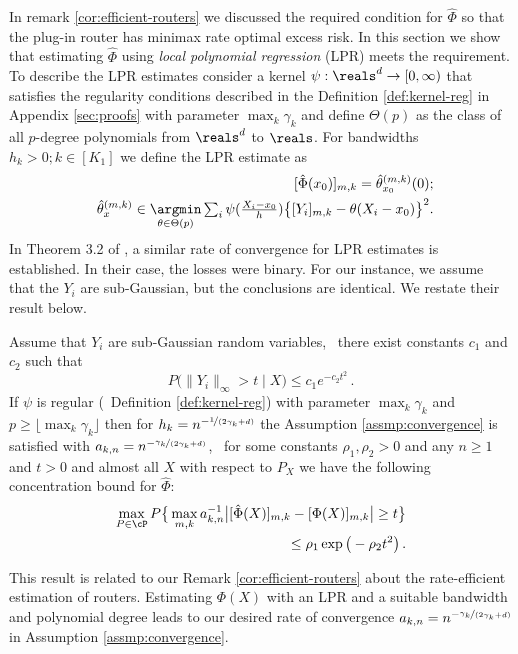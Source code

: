 In remark \ref{cor:efficient-routers} we discussed the required condition for $\hat \Phi$ so that the plug-in router has minimax rate optimal excess risk. In this section we show that estimating $\hat \Phi$ using \emph{local polynomial regression} (LPR) meets the requirement.  To describe the LPR estimates consider a kernel $\psi: \reals^d \to [0, \infty)$ that satisfies the regularity conditions described in the Definition \ref{def:kernel-reg} in  Appendix \ref{sec:proofs} with parameter $\max_k \gamma_k$ and define $\Theta(p)$ as the class of all $p$-degree polynomials from $\reals^d$ to $\reals$. For bandwidths $h_k > 0; k \in [K_1]$ we define the LPR estimate as 
\begin{align}\label{eq:LPR}
    [\hat \Phi(x_0)]_{m, k} = \hat\theta_{x_0}^{(m, k)}(0); \nonumber \\
    ~~ \hat \theta_x^{(m, k)} \in \underset{\theta \in \Theta(p)}{\argmin}  \textstyle \sum_{i} \psi (\frac{X_i - x_0}{h}) \big \{[Y_i]_{m ,k} - \theta (X_i -x_0 )\big\}^2. 
\end{align}
In Theorem 3.2 of \citet{audibert2007Fast}, a similar rate of convergence for LPR estimates is established. In their case, the losses were binary. For our instance, we assume that the $Y_i$ are sub-Gaussian, but the conclusions are identical. We restate their result below.
\begin{lemma}
    Assume that $Y_i$ are sub-Gaussian random variables, \ie\ there exist constants $c_1$ and $c_2$ such that  
    \[
    \textstyle P\big ( \|Y_i\|_\infty > t \mid X\big ) \le c_1 e^{-c_2t^2}\,. 
    \] If $\psi$ is regular (\cf\ Definition \ref{def:kernel-reg}) with parameter $\max_k \gamma_k$  and $p \ge  \lfloor \max_k \gamma_k \rfloor$ then for $h_k = n^{-\nicefrac{1}{(2\gamma_k + d)}}$ the Assumption \ref{assmp:convergence} is satisfied with $a_{k, n} = n^{-\nicefrac{\gamma_k}{(2\gamma_k + d)}}$, \ie\ for some constants $\rho_1, \rho_2 > 0$ and any $n \ge 1$ and $t > 0$ and almost all $X$ with respect to $P_X$ we have the following concentration bound for $\hat \Phi$:
    \begin{align}\label{eq:concentration-phi-2}
        \max_{P\in \cP} P \big \{ \max_{m, k} a_{k, n}^{-1}\big |[\hat \Phi (X)]_{m, k} - [\Phi  (X)]_{m, k}\big |  \ge t\big \} \nonumber \\
        \le  \rho_1 \exp\big (- \rho_2  t^2 \big )\,.
    \end{align}
\end{lemma}
This result is related to our Remark \ref{cor:efficient-routers} about the rate-efficient estimation of routers. Estimating $\Phi(X)$ with an LPR and a suitable bandwidth and polynomial degree leads to our desired rate of convergence $a_{k, n} = n^{-\nicefrac{\gamma_k}{(2\gamma_k + d)}}$ in Assumption \ref{assmp:convergence}. 

